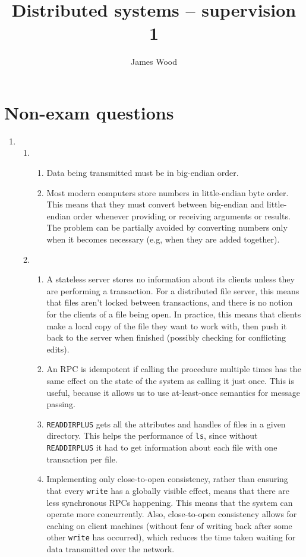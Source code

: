 \documentclass{article}
\begin{document}
\title{Distributed systems -- supervision 1}
\author{James Wood}
\maketitle

\section{Non-exam questions}

\begin{enumerate}
  \item
    \begin{enumerate}
      \item
        \begin{enumerate}
          \item Data being transmitted must be in big-endian order.
          \item Most modern computers store numbers in little-endian byte order. This means that they must convert between big-endian and little-endian order whenever providing or receiving arguments or results. The problem can be partially avoided by converting numbers only when it becomes necessary (e.g, when they are added together).
        \end{enumerate}
      \item
        \begin{enumerate}
          \item A stateless server stores no information about its clients unless they are performing a transaction. For a distributed file server, this means that files aren't locked between transactions, and there is no notion for the clients of a file being open. In practice, this means that clients make a local copy of the file they want to work with, then push it back to the server when finished (possibly checking for conflicting edits).
          \item An RPC is idempotent if calling the procedure multiple times has the same effect on the state of the system as calling it just once. This is useful, because it allows us to use at-least-once semantics for message passing.
          \item \texttt{READDIRPLUS} gets all the attributes and handles of files in a given directory. This helps the performance of \texttt{ls}, since without \texttt{READDIRPLUS} it had to get information about each file with one transaction per file.
          \item Implementing only close-to-open consistency, rather than ensuring that every \texttt{write} has a globally visible effect, means that there are less synchronous RPCs happening. This means that the system can operate more concurrently. Also, close-to-open consistency allows for caching on client machines (without fear of writing back after some other \texttt{write} has occurred), which reduces the time taken waiting for data transmitted over the network.

\end{enumerate}
\end{enumerate}
\end{enumerate}
\end{document}

